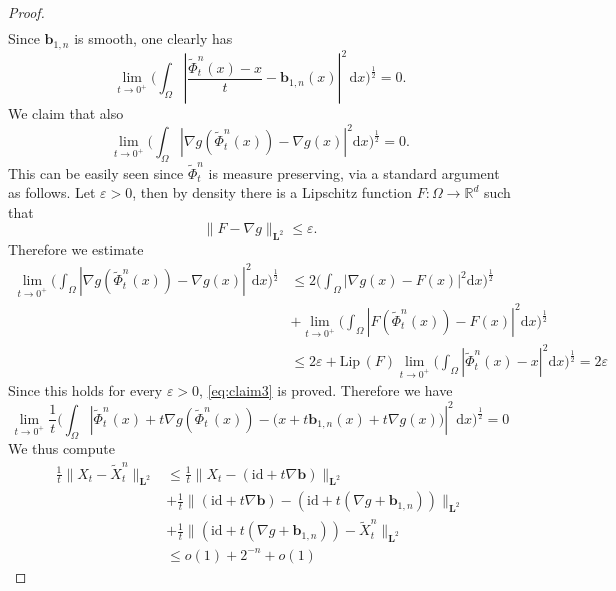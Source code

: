 \documentclass[11pt, twoside, reqno]{amsart}
\newcounter{clai}
\theoremstyle{definition} \newtheorem{definition}{Definition}[section]
\theoremstyle{definition} \newtheorem{remark}[definition]{Remark}
\theoremstyle{plain} \newtheorem{lemma}[definition]{Lemma}
\theoremstyle{plain} \newtheorem{proposition}[definition]{Proposition}
\theoremstyle{plain} \newtheorem{theorem}[definition]{Theorem}
\theoremstyle{plain} \newtheorem{corollary}[definition]{Corollary}
\theoremstyle{definition} \newtheorem{example}[definition]{Example}
\theoremstyle{plain} \newtheorem{claim}[clai]{Claim}
\theoremstyle{definition} \newtheorem{assumption}[definition]{Assumption}
\newcommand{\Id}{\mathrm{id}}
\newcommand{\1}{\mathbbm 1}
\renewcommand{\b}{\mathbf b}
\numberwithin{equation}{section} %
\theoremstyle{plain} \newtheorem*{theorem*}{Theorem}
\theoremstyle{plain} \newtheorem{mthm}[maintheorem]{Main Theorem}
\theoremstyle{plain} \newtheorem*{mthm*}{Main Theorem}
\theoremstyle{plain} \newtheorem*{conjecture*}{Conjecture}
\theoremstyle{plain} \newtheorem{conjecture}[definition]{Conjecture}
\theoremstyle{plain} \newtheorem*{problem*}{Problem}
\begin{document}
\begin{proof}
\begin{equation*}
\begin{aligned}
    \end{aligned}
\end{equation*}
Since $\b_{1,n}$ is smooth, one clearly has
$$
\lim_{t \to 0^+} \Bigg( \int_\Omega \left| \frac{\tilde \Phi^n_t(x) - x}{t} - \b_{1,n}(x)\right|^2  \,\mathrm{d} x \Bigg)^{\frac{1}{2}} = 0.
$$
We claim that also 
\begin{equation}\label{eq:claim3}
    \lim_{t \to 0^+} \Bigg(\int_\Omega | \nabla g({\tilde \Phi^n_t(x)}) -   \nabla g(x)|^2 \mathrm{d} x\Bigg)^{\frac{1}{2}} = 0.
\end{equation}
This can be easily seen since $\tilde \Phi_t^n$ is measure preserving, via a standard argument as follows. Let $\varepsilon > 0$, then by density there is a Lipschitz function $F: \Omega \to \mathbb R^d$ such that 
$$
\|F- \nabla g\|_{\mathbf L^2} \leq \varepsilon.
$$
Therefore we estimate 
$$
\begin{aligned}
   \lim_{t \to 0^+} \Bigg(\int_\Omega | \nabla g({\tilde \Phi^n_t(x)}) -   \nabla g(x)|^2 \mathrm{d} x \Bigg)^{\frac{1}{2}}& \leq 2\Bigg(\int_\Omega | \nabla g(x) - F(x)|^2 \mathrm{d} x\Bigg)^{\frac{1}{2}} \\
   & +  \lim_{t \to 0^+} \Bigg(\int_\Omega | F({\tilde \Phi^n_t(x)}) -  F(x)|^2 \mathrm{d} x\Bigg)^{\frac{1}{2}} \\
    & \leq 2 \varepsilon + \mathrm{Lip} \, (F)  \lim_{t \to 0^+}  \Bigg(\int_\Omega |\tilde \Phi_t^n(x) - x|^2 \mathrm{d} x \Bigg)^{\frac{1}{2}}= 2\varepsilon
\end{aligned}
$$
Since this holds for every $\varepsilon  >0$, \eqref{eq:claim3} is proved.
Therefore we have
\begin{equation}\label{eq:tildephi}
    \lim_{t \to 0^+} \frac{1}{t}\Bigg(\int_\Omega \left| {\tilde \Phi^n_t(x)} + t \nabla g({\tilde \Phi^n_t(x)}) - \Big( x + t \b_{1,n}(x) + t \nabla g(x) \Big)\right|^2  \,\mathrm{d} x\Bigg)^{\frac{1}{2}} = 0
\end{equation}
We thus compute
\begin{equation}
    \begin{aligned}
        \frac{1}{t}\|X_t - \tilde X_t^n\|_{\mathbf L^2} & \leq \frac{1}{t}\|X_t - (\Id + t \nabla \b)\|_{\mathbf L^2} \\
        & + \frac{1}{t}\|(\Id + t \nabla \b) -(\Id + t (\nabla g + \b_{1,n}))\|_{\mathbf L^2} \\
        & + \frac{1}{t}\| (\Id + t (\nabla g + \b_{1,n})) - \tilde X_t^n\|_{\mathbf L^2}\\
        & \leq o(1) +2^{-n} + o(1)
    \end{aligned}

\end{equation}
\end{proof}
\end{document}
